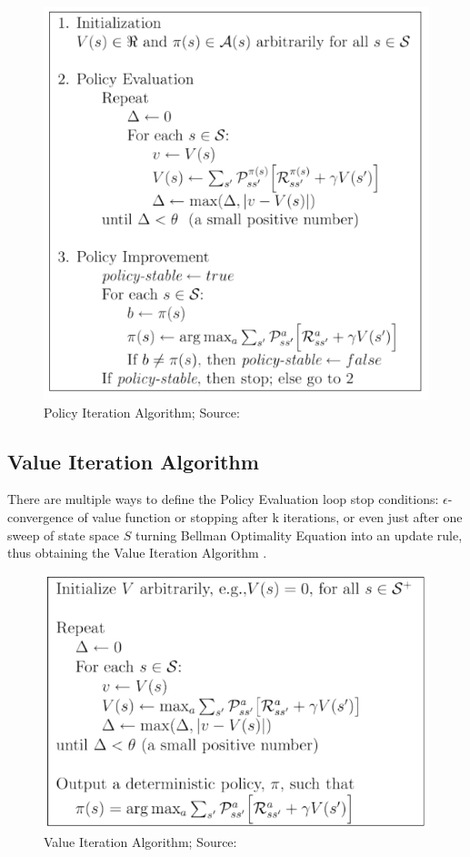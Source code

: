 \begin{figure}[h!]
  \centering
  \includegraphics[scale=0.6]{figures/policy_iteration_algorithm.PNG}
  \caption{Policy Iteration Algorithm; Source: \cite{lecture_dp}}
  \label{fig:pia}
\end{figure}

\subsection{Value Iteration Algorithm}

There are multiple ways to define the Policy Evaluation loop stop conditions: $\epsilon$-convergence of value function or stopping after k iterations, or even just after one sweep of state space $S$ turning Bellman Optimality Equation into an update rule, thus obtaining the Value Iteration Algorithm \cite{lecture_dp}. 
\begin{figure}[H]
  \centering
  \includegraphics[scale=0.5]{figures/value_iteration_algorithm.PNG}
  \caption{Value Iteration Algorithm; Source: \cite{lecture_dp}}
  \label{fig:via}
\end{figure}

